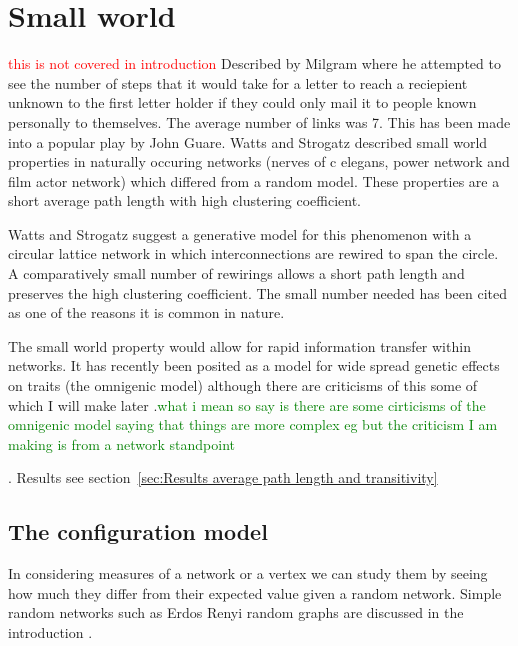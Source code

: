 \section{Small world}
\label{sec:Small world}
\textcolor{red}{this is not covered in introduction}
Described by Milgram \cite{milgram1967small} where he attempted to see the number of steps that it would take for a letter to reach a reciepient unknown to the first letter holder if they could only mail it to people known personally to themselves. The average number of links was 7. This has been made into a popular play by John Guare. Watts and Strogatz \cite{watts1998collective} described small world properties in naturally occuring networks (nerves of c elegans, power network and film actor network) which differed from a random model. These properties are a short average path length with high clustering coefficient. 

Watts and Strogatz \cite{watts1998collective} suggest a generative model for this phenomenon with a circular lattice network in which interconnections are rewired to span the circle. A comparatively small number of rewirings allows a short path length and preserves the high clustering coefficient. The small number needed has been cited as one of the reasons it is common in nature. 

The small world property would allow for rapid information transfer within networks. It has recently been posited as a model for wide spread genetic effects on traits (the omnigenic model) \cite{boyle2017expanded} although there are criticisms of this some of which I will make later .\textcolor{green}{what i mean so say is there are some cirticisms of the omnigenic model saying that things are more complex eg \cite{wray2018common} \cite{boyle2017omnigenic_response}  but the criticism I am making is from a network standpoint} 


. Results see section~\ref{sec:Results average path length and transitivity}

\subsection{The configuration model}
\label{sec:configuration model}
In considering measures of  a network or a vertex we can study them by seeing how much they differ from their expected value given a random network. Simple random networks such as Erdos Renyi random graphs are discussed in the introduction .

